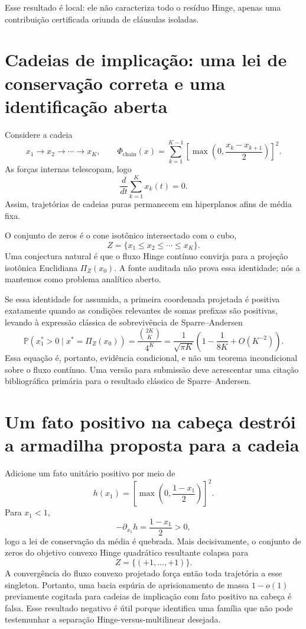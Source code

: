\documentclass[11pt,a4paper]{article}
\begin{document}
Esse resultado é local: ele não caracteriza todo o resíduo Hinge, apenas uma contribuição certificada oriunda de cláusulas isoladas.

\section{Cadeias de implicação: uma lei de conservação correta e uma identificação aberta}
Considere a cadeia
\[
x_1\to x_2\to\cdots\to x_K,
\qquad
\Phi_{\mathrm{chain}}(x)=\sum_{k=1}^{K-1}\left[\max\left(0,\frac{x_k-x_{k+1}}2\right)\right]^2.
\]
As forças internas telescopam, logo
\begin{equation}
\frac{d}{dt}\sum_{k=1}^Kx_k(t)=0.
\end{equation}
Assim, trajetórias de cadeias puras permanecem em hiperplanos afins de média fixa.

O conjunto de zeros é o cone isotônico intersectado com o cubo,
\[
Z=\{x_1\le x_2\le\cdots\le x_K\}.
\]
Uma conjectura natural é que o fluxo Hinge contínuo convirja para a projeção isotônica Euclidiana $\Pi_Z(x_0)$. A fonte auditada não prova essa identidade; nós a mantemos como problema analítico aberto.

Se essa identidade for assumida, a primeira coordenada projetada é positiva exatamente quando as condições relevantes de somas prefixas são positivas, levando à expressão clássica de sobrevivência de Sparre--Andersen
\begin{equation}
\mathbb P(x_1^*>0\mid x^*=\Pi_Z(x_0))
=\frac{\binom{2K}{K}}{4^K}
=\frac1{\sqrt{\pi K}}\left(1-\frac1{8K}+O(K^{-2})\right).
\end{equation}
Essa equação é, portanto, evidência condicional, e não um teorema incondicional sobre o fluxo contínuo. Uma versão para submissão deve acrescentar uma citação bibliográfica primária para o resultado clássico de Sparre--Andersen.

\section{Um fato positivo na cabeça destrói a armadilha proposta para a cadeia}
Adicione um fato unitário positivo por meio de
\[
h(x_1)=\left[\max\left(0,\frac{1-x_1}{2}\right)\right]^2.
\]
Para $x_1<1$,
\[
-\partial_{x_1}h=\frac{1-x_1}{2}>0,
\]
logo a lei de conservação da média é quebrada. Mais decisivamente, o conjunto de zeros do objetivo convexo Hinge quadrático resultante colapsa para
\[
Z=\{(+1,\ldots,+1)\}.
\]
A convergência do fluxo convexo projetado força então toda trajetória a esse singleton. Portanto, uma bacia espúria de aprisionamento de massa $1-o(1)$ previamente cogitada para cadeias de implicação com fato positivo na cabeça é falsa. Esse resultado negativo é útil porque identifica uma família que não pode testemunhar a separação Hinge-versus-multilinear desejada.
\end{document}
